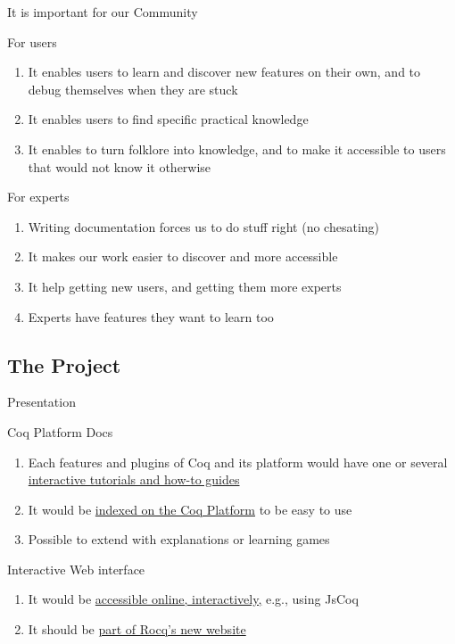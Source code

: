 \documentclass[10pt]{beamer}
\begin{document}
\begin{frame}{It is important for our Community}
\begin{tcbProp}{For users}
  \begin{enumerate}
    \item It enables users to learn and discover new features on their own,
          and to debug themselves when they are stuck
    \item<2-> It enables users to find specific practical knowledge
    \item<3-> It enables to turn folklore into knowledge, and to make it
          accessible to users that would not know it otherwise
  \end{enumerate}
\end{tcbProp}
\begin{tcbProp}{For experts}
  \begin{enumerate}
    \item<4-> Writing documentation forces us to do stuff right (no chesating)
    \item<5-> It makes our work easier to discover and more accessible
    \item<6-> It help getting new users, and getting them more experts
    \item<7-> Experts have features they want to learn too
  \end{enumerate}
\end{tcbProp}
\end{frame}

\subsection{The Project}

\begin{frame}{Presentation}
  \begin{tcbObj}{Coq Platform Docs}
    \begin{enumerate}
      \item<1-> Each features and plugins of Coq and its platform would have one
            or several \ul{interactive tutorials and how-to guides}
      \item<2-> It would be \ul{indexed on the Coq Platform} to be easy to use
      \item<3-> Possible to extend with explanations or learning games
    \end{enumerate}
  \end{tcbObj}
  \begin{tcbObj}{Interactive Web interface}
    \begin{enumerate}
      \item<5-> It would be \ul{accessible online, interactively,} e.g., using JsCoq
      \item<6-> It should be \ul{part of Rocq's new website}
    \end{enumerate}
  \end{tcbObj}
\end{frame}
\end{document}
